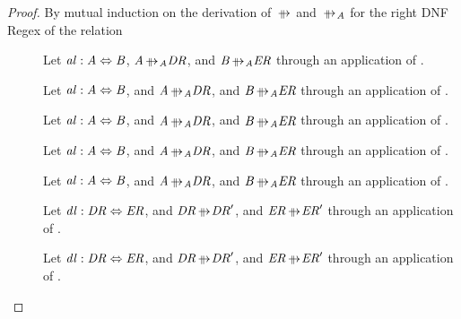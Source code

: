 \documentclass[numbers]{sigplanconf}
\begin{document}
\begin{proof}
  By mutual induction on the derivation of $\ParallelRewrite$ and $\ParallelRewriteAtom$ for
  the right DNF Regex of the relation
  \begin{description}
  \item[\LeftUnrollRewriteRule{}]
    Let $\mathit{al} : \mathit{A} \Leftrightarrow \mathit{B}$,
    $\Atom\ParallelRewriteAtom\DNFRegex$, and $\AtomAlt\ParallelRewriteAtom\DNFRegexAlt$
    through an application of \LeftUnrollRewriteRule{}.
  \item[\RightUnrollRewriteRule{}]
    Let $\mathit{al} : \mathit{A} \Leftrightarrow \mathit{B}$, and
    $\Atom\ParallelRewriteAtom\DNFRegex$, and $\AtomAlt\ParallelRewriteAtom\DNFRegexAlt$
    through an application of \RightUnrollRewriteRule{}.
  \item[]
    Let $\mathit{al} : \mathit{A} \Leftrightarrow \mathit{B}$, and
    $\Atom\ParallelRewriteAtom\DNFRegex$, and $\AtomAlt\ParallelRewriteAtom\DNFRegexAlt$
    through an application of .
  \item[]
    Let $\mathit{al} : \mathit{A} \Leftrightarrow \mathit{B}$, and
    $\Atom\ParallelRewriteAtom\DNFRegex$, and $\AtomAlt\ParallelRewriteAtom\DNFRegexAlt$
    through an application of .
  \item[\StarIntroRewriteRule{}]
    Let $\mathit{al} : \mathit{A} \Leftrightarrow \mathit{B}$, and
    $\Atom\ParallelRewriteAtom\DNFRegex$, and $\AtomAlt\ParallelRewriteAtom\DNFRegexAlt$
    through an application of \StarIntroRewriteRule{}.
  \item[\DNFIntroRewriteRule{}]
    Let $\mathit{dl} : \mathit{DR} \Leftrightarrow \mathit{ER}$, and
    $\DNFRegex\ParallelRewrite\DNFRegex'$, and $\DNFRegexAlt\ParallelRewrite\DNFRegexAlt'$
    through an application of \DNFIntroRewriteRule{}.
  \item[\IdentityRewriteRule{}]
    Let $\mathit{dl} : \mathit{DR} \Leftrightarrow \mathit{ER}$, and
    $\DNFRegex\ParallelRewrite\DNFRegex'$, and $\DNFRegexAlt\ParallelRewrite\DNFRegexAlt'$
    through an application of \IdentityRewriteRule{}.
  \end{description}
\end{proof}
\end{document}
